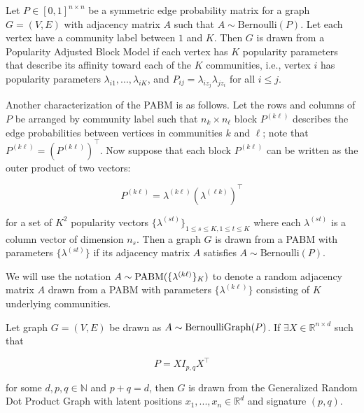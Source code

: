 \documentclass[12pt]{article}
\begin{document}
\begin{definition}
\label{pabm}
Let $P \in [0, 1]^{n \times n}$ be a symmetric edge probability matrix for a
graph $G = (V, E)$ with adjacency matrix $A$ 
such that $A \sim \mathrm{Bernoulli}(P)$.
Let each vertex have a community label between $1$ and $K$.
Then $G$ is drawn from a Popularity Adjusted Block Model if
each vertex has $K$ popularity parameters that describe its affinity
toward each of the $K$ communities, i.e., vertex $i$ has popularity parameters
$\lambda_{i1}, ..., \lambda_{iK}$, and  $P_{ij} = \lambda_{i z_j}
\lambda_{j z_i}$ for all $i \leq j$. 

Another characterization of the PABM is as follows.
Let the rows and columns of $P$ be arranged by community label
such that $n_k \times n_{\ell}$ block $P^{(k \ell)}$
describes the edge probabilities between vertices in communities
$k$ and $\ell$; note that $P^{(k \ell)} = (P^{(k \ell)})^\top$.
Now suppose that each block $P^{(k \ell)}$ can be written as the outer product of two vectors:

\begin{equation} \label{eq:pabm}
  P^{(k \ell)} = \lambda^{(k \ell)} (\lambda^{(\ell k)})^\top
\end{equation}

for a set of $K^2$ popularity vectors $\{\lambda^{(st)}\}_{1 \leq
  s \leq K, 1 \leq t \leq K}$ where each
$\lambda^{(st)}$ is a column vector of dimension $n_s$. Then a graph $G$
is drawn from a PABM with parameters
$\{\lambda^{(st)}\}$ if its adjacency matrix $A$
satisfies $A \sim \mathrm{Bernoulli}(P)$.
\end{definition}

We will use the notation \(A \sim \mathrm{PABM}(\{\lambda^{(k \ell)}\}_K)\) to denote
a random adjacency matrix \(A\) drawn from a PABM with parameters
\(\{\lambda^{(k \ell)}\}\) consisting of \(K\) underlying communities.

\begin{definition}
\label{grdpg}
Let graph $G = (V, E)$ be drawn as $A \sim \mathrm{BernoulliGraph}(P)$.
If $\exists X \in \mathbb{R}^{n \times d}$ such that

\begin{equation} \label{eq:grdpg}
  P = X I_{p,q} X^\top
\end{equation}

for some $d, p, q \in \mathbb{N}$ and $p + q = d$, then
$G$ is drawn from the Generalized Random Dot Product Graph 
with latent positions $x_1, ..., x_n \in \mathbb{R}^d$ and signature $(p, q)$.
\end{definition}
\end{document}
